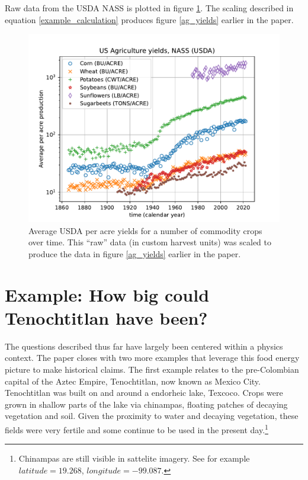 \documentclass[jou]{apa7}
\begin{document}
Raw data from the USDA NASS is plotted in figure \ref{raw_production_per_acre}.  The scaling described in equation \ref{example_calculation} produces figure \ref{ag_yields} earlier in the paper.
\begin{figure}[ht!]
\centering
\includegraphics[width=\columnwidth]{raw_production_per_acre.pdf}
\caption{
Average USDA per acre yields for a number of commodity crops over time.  This ``raw'' data (in custom harvest units) was scaled to produce the data in figure \ref{ag_yields} earlier in the paper. 
}
\label{raw_production_per_acre}
\end{figure}



\section{Example: How big could Tenochtitlan have been?}
The questions described thus far have largely been centered within a physics context.  The paper closes with two more examples that leverage this food energy picture to make historical claims.  The first example relates to the pre-Colombian capital of the Aztec Empire, Tenochtitlan, now known as Mexico City.  Tenochtitlan was built on and around a endorheic lake, Texcoco.  Crops were grown in shallow parts of the lake via chinampas,\cite{national_geo} floating patches of decaying vegetation and soil.  Given the proximity to water and decaying vegetation, these fields were very fertile\cite{HortTech_2019,Chinampas_1964} and some continue to be used in the present day.\footnote{Chinampas are still visible in sattelite imagery.  See for example $latitude=19.268$, $longitude=-99.087$.}
\end{document}
